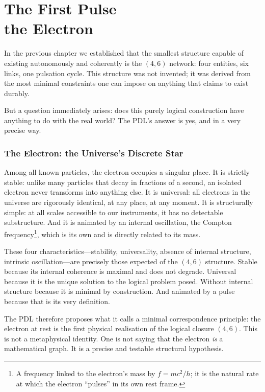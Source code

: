 \documentclass[12pt, a4paper, openright]{book}
\begin{document}
\chapter[The First Pulse --- the Electron]{The First Pulse \\ the Electron}

In the previous chapter we established that the smallest structure capable of existing autonomously and coherently is the $(4,6)$ network: four entities, six links, one pulsation cycle. This structure was not invented; it was derived from the most minimal constraints one can impose on anything that claims to exist durably.

\medskip

But a question immediately arises: does this purely logical construction have anything to do with the real world? The PDL's answer is yes, and in a very precise way.

\subsection*{The Electron: the Universe's Discrete Star}

Among all known particles, the electron occupies a singular place. It is strictly stable: unlike many particles that decay in fractions of a second, an isolated electron never transforms into anything else. It is universal: all electrons in the universe are rigorously identical, at any place, at any moment. It is structurally simple: at all scales accessible to our instruments, it has no detectable substructure. And it is animated by an internal oscillation, the Compton frequency\footnote{A frequency linked to the electron's mass by $f = mc^2/h$; it is the natural rate at which the electron ``pulses'' in its own rest frame.}, which is its own and is directly related to its mass.

\medskip

These four characteristics---stability, universality, absence of internal structure, intrinsic oscillation---are precisely those expected of the $(4,6)$ structure. Stable because its internal coherence is maximal and does not degrade. Universal because it is the unique solution to the logical problem posed. Without internal structure because it is minimal by construction. And animated by a pulse because that is its very definition.

\medskip

The PDL therefore proposes what it calls a minimal correspondence principle: the electron at rest is the first physical realisation of the logical closure $(4,6)$. This is not a metaphysical identity. One is not saying that the electron \emph{is} a mathematical graph. It is a precise and testable structural hypothesis.
\end{document}
